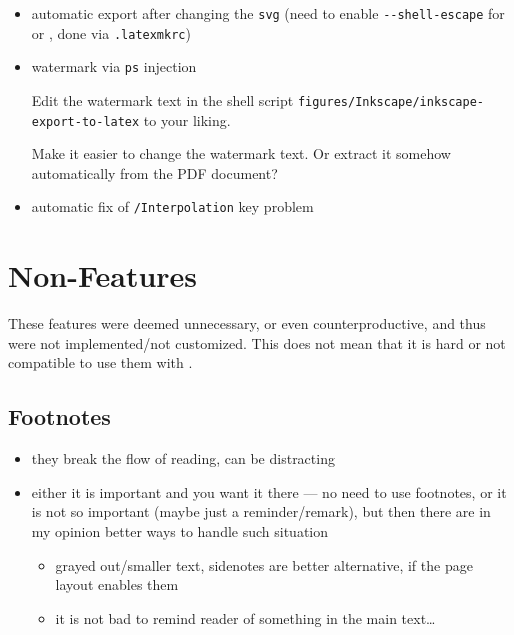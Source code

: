 \begin{itemize}
    \item automatic export after changing the \texttt{svg} (need to enable \verb|--shell-escape| for \pdfTeX{} or \LuaTeX{}, done via \texttt{.latexmkrc})
    \item watermark via \texttt{ps} injection
        \begin{Note}
            Edit the watermark text in the shell script \verb|figures/Inkscape/inkscape-export-to-latex| to your liking.
        \end{Note}
        \begin{Todo}
            Make it easier to change the watermark text. Or extract it somehow automatically from the PDF document?
        \end{Todo}
    \item automatic fix of \texttt{/Interpolation} key problem
\end{itemize}


\section{Non-Features}%
\label{sec:Non-Features}

These features were deemed unnecessary, or even counterproductive, and thus were not implemented/not customized.
This does not mean that it is hard or not compatible to use them with \TeXtured{}.

\subsection{Footnotes}%
\label{sub:Footnotes}

\begin{itemize}
    \item they break the flow of reading, can be distracting
    \item either it is important and you want it there --- no need to use footnotes,
          or it is not so important (maybe just a reminder/remark), but then there
          are in my opinion better ways to handle such situation
          \begin{itemize}
              \item grayed out/smaller text, sidenotes are better alternative, if the page layout enables them
              \item it is not bad to remind reader of something in the main text\ldots
          \end{itemize}
\end{itemize}

